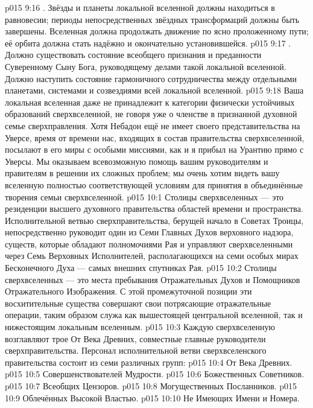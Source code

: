 \vs p015 9:16 . Звёзды и планеты локальной вселенной должны находиться в равновесии; периоды непосредственных звёздных трансформаций должны быть завершены. Вселенная должна продолжать движение по ясно проложенному пути; её орбита должна стать надёжно и окончательно установившейся.
\vs p015 9:17 . Должно существовать состояние всеобщего признания и преданности Суверенному Сыну Бога, руководящему делами такой локальной вселенной. Должно наступить состояние гармоничного сотрудничества между отдельными планетами, системами и созвездиями всей локальной вселенной.
\vs p015 9:18 \pc Ваша локальная вселенная даже не принадлежит к категории физически устойчивых образований сверхвселенной, не говоря уже о членстве в признанной духовной семье сверхправления. Хотя Небадон ещё не имеет своего представительства на Уверсе, время от времени нас, входящих в состав правительства сверхвселенной, посылают в его миры с особыми миссиями, как и я прибыл на Урантию прямо с Уверсы. Мы оказываем всевозможную помощь вашим руководителям и правителям в решении их сложных проблем; мы очень хотим видеть вашу вселенную полностью соответствующей условиям для принятия в объединённые творения семьи сверхвселенной.
\vs p015 10:1 Столицы сверхвселенных --- это резиденции высшего духовного правительства областей времени и пространства. Исполнительной ветвью сверхправительства, берущей начало в Советах Троицы, непосредственно руководит один из Семи Главных Духов верховного надзора, существ, которые обладают полномочиями Рая и управляют сверхвселенными через Семь Верховных Исполнителей, располагающихся на семи особых мирах Бесконечного Духа --- самых внешних спутниках Рая.
\vs p015 10:2 Столицы сверхвселенных --- это места пребывания Отражательных Духов и Помощников Отражательного Изображения. С этой промежуточной позиции эти восхитительные существа совершают свои потрясающие отражательные операции, таким образом служа как вышестоящей центральной вселенной, так и нижестоящим локальным вселенным.
\vs p015 10:3 \pc Каждую сверхвселенную возглавляют трое От Века Древних, совместные главные руководители сверхправительства. Персонал исполнительной ветви сверхвселенского правительства состоит из семи различных групп:
\vs p015 10:4 От Века Древних.
\vs p015 10:5 Совершенствователей Мудрости.
\vs p015 10:6 Божественных Советников.
\vs p015 10:7 Всеобщих Цензоров.
\vs p015 10:8 Могущественных Посланников.
\vs p015 10:9 Облечённых Высокой Властью.
\vs p015 10:10 Не Имеющих Имени и Номера.
